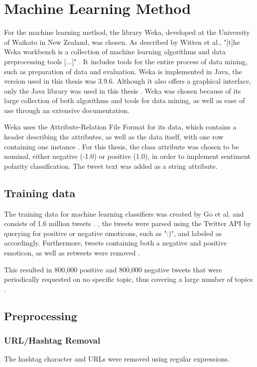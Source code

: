 \section{Machine Learning Method}

For the machine learning method, the library Weka, developed at the University of Waikato in New Zealand, was chosen. As described by Witten et al., "[t]he Weka workbench is a collection of machine learning algorithms and data preprocessing tools [...]" \cite[p.~7]{Weka}. It includes tools for the entire process of data mining, such as preparation of data and evaluation. Weka is implemented in Java, the version used in this thesis was 3.9.6. Although it also offers a graphical interface, only the Java library was used in this thesis \cite{Weka}. Weka was chosen because of its large collection of both algorithms and tools for data mining, as well as ease of use through an extensive documentation.

Weka uses the Attribute-Relation File Format for its data, which contains a header describing the attributes, as well as the data itself, with one row containing one instance \cite{Weka}. For this thesis, the class attribute was chosen to be nominal, either negative (-1.0) or positive (1.0), in order to implement sentiment polarity classification. The tweet text was added as a string attribute.

\subsection{Training data}
The training data for machine learning classifiers was created by Go et al. and consists of 1.6 million tweets \cite{GoBHaHua2009}. , the tweets were parsed using the Twitter API by querying for positive or negative emoticons, such as ":)", and labeled as accordingly. Furthermore, tweets containing both a negative and positive emoticon, as well as retweets were removed \cite{GoBHaHua2009}.

This resulted in 800,000 positive and 800,000 negative tweets that were periodically requested on no specific topic, thus covering a large number of topics \cite{GoBHaHua2009}.

\subsection{Preprocessing}

\subsubsection{URL/Hashtag Removal}
The hashtag character and URLs were removed using regular expressions.

